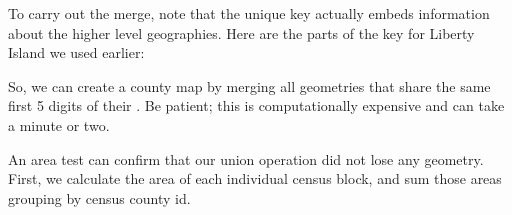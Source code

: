 \documentclass[a4paper,11pt,english]{sphinxmanual}
\begin{document}
To carry out the merge, note that the unique key  actually embeds information about the higher level geographies. Here are the parts of the key for Liberty Island we used earlier:

\begin{sphinxVerbatim}[commandchars=\\\{\}]
      

         
        
   
         
      
\end{sphinxVerbatim}

So, we can create a county map by merging all geometries that share the same first 5 digits of their . Be patient; this is computationally expensive and can take a minute or two.

\begin{sphinxVerbatim}[commandchars=\\\{\}]
   
    
    
 
  
\end{sphinxVerbatim}

\noindent{}

An area test can confirm that our union operation did not lose any geometry. First, we calculate the area of each individual census block, and sum those areas grouping by census county id.

\begin{sphinxVerbatim}[commandchars=\\\{\}]
      
 
  
  
\end{sphinxVerbatim}
\end{document}
